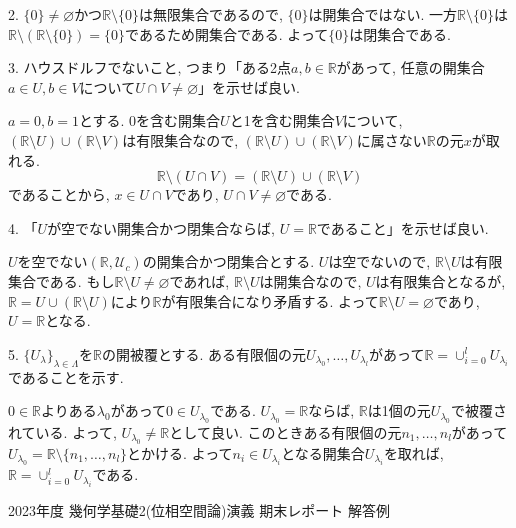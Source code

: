 \documentclass[dvipdfmx,a4paper,11pt]{article}
\newcommand{\R}{\mathbb{R}}
\theoremstyle{definition}
\begin{document}
2. $\{ 0\} \neq \varnothing$かつ$\R \setminus \{ 0\}$は無限集合であるので, $\{0\}$は開集合ではない.
一方$\R \setminus \{0 \}$は$\R\setminus (\R \setminus \{ 0\})=\{ 0\}$であるため開集合である.
よって$\{0\}$は閉集合である.

3. ハウスドルフでないこと, つまり「ある2点$a,b \in \R$があって, 任意の開集合$a \in U, b \in V$について$U \cap V \neq \varnothing$」を示せば良い.

$a=0, b=1$とする. 0を含む開集合$U$と1を含む開集合$V$について, $(\R \setminus U )\cup (\R \setminus V)$は有限集合なので, 
$(\R \setminus U )\cup (\R \setminus V)$に属さない$\R$の元$x$が取れる. 
$$\R \setminus (U \cap V) = (\R \setminus U )\cup (\R \setminus V)$$
であることから, $x \in U \cap V$であり, $U \cap V \neq \varnothing$である. 

4. 「$U$が空でない開集合かつ閉集合ならば, $U=\R$であること」を示せば良い.

$U$を空でない$(\R,\mathscr{U}_c)$の開集合かつ閉集合とする. $U$は空でないので, $\R \setminus U$は有限集合である. 
もし$\R\setminus U \neq \varnothing$であれば, $\R \setminus U$は開集合なので, $U$は有限集合となるが, 
$\R = U  \cup (\R \setminus U)$により$\R$が有限集合になり矛盾する.
よって$\R\setminus U = \varnothing$であり, $U = \R$となる. 

5. $\{ U_{\lambda}\}_{\lambda \in \Lambda}$を$\R$の開被覆とする.
ある有限個の元$U_{\lambda_0}, \ldots, U_{\lambda_l}$があって$\R = \cup_{i=0}^{l} U_{\lambda_i}$であることを示す.

$0 \in \R$よりある$\lambda_{0}$があって$0 \in U_{\lambda_0}$である. 
$U_{\lambda_0}=\R$ならば, $\R$は1個の元$U_{\lambda_0}$で被覆されている.
よって, $U_{\lambda_0} \neq \R$として良い.
このときある有限個の元$n_1, \ldots, n_l$があって$U_{\lambda_{0}} = \R\setminus \{ n_1,\ldots, n_l\}$とかける.
よって$n_i \in U_{\lambda_i}$となる開集合$U_{\lambda_i}$を取れば, $\R = \cup_{i=0}^{l} U_{\lambda_i}$である.

\newpage
\begin{center}
{\Large 2023年度 幾何学基礎2(位相空間論)演義 期末レポート 解答例} \\

\vspace{5pt}
\end{center}
\end{document}
